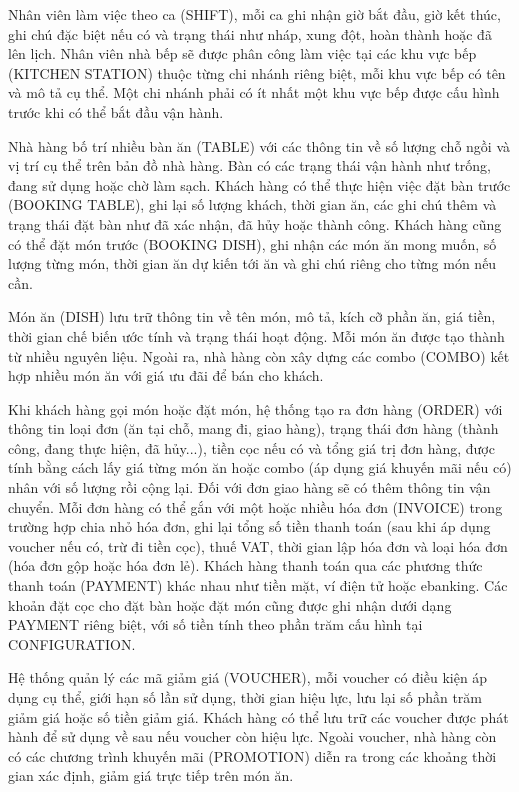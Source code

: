 Nhân viên làm việc theo ca (SHIFT), mỗi ca ghi nhận giờ bắt đầu, giờ kết thúc, ghi chú đặc biệt nếu có và trạng thái như nháp, xung đột, hoàn thành hoặc đã lên lịch. Nhân viên nhà bếp sẽ được phân công làm việc tại các khu vực bếp (KITCHEN STATION) thuộc từng chi nhánh riêng biệt, mỗi khu vực bếp có tên và mô tả cụ thể. Một chi nhánh phải có ít nhất một khu vực bếp được cấu hình trước khi có thể bắt đầu vận hành.

Nhà hàng bố trí nhiều bàn ăn (TABLE) với các thông tin về số lượng chỗ ngồi và vị trí cụ thể trên bản đồ nhà hàng. Bàn có các trạng thái vận hành như trống, đang sử dụng hoặc chờ làm sạch. Khách hàng có thể thực hiện việc đặt bàn trước (BOOKING TABLE), ghi lại số lượng khách, thời gian ăn, các ghi chú thêm và trạng thái đặt bàn như đã xác nhận, đã hủy hoặc thành công. Khách hàng cũng có thể đặt món trước (BOOKING DISH), ghi nhận các món ăn mong muốn, số lượng từng món, thời gian ăn dự kiến tới ăn và ghi chú riêng cho từng món nếu cần.

Món ăn (DISH) lưu trữ thông tin về tên món, mô tả, kích cỡ phần ăn, giá tiền, thời gian chế biến ước tính và trạng thái hoạt động. Mỗi món ăn được tạo thành từ nhiều nguyên liệu. Ngoài ra, nhà hàng còn xây dựng các combo (COMBO) kết hợp nhiều món ăn với giá ưu đãi để bán cho khách.

Khi khách hàng gọi món hoặc đặt món, hệ thống tạo ra đơn hàng (ORDER) với thông tin loại đơn (ăn tại chỗ, mang đi, giao hàng), trạng thái đơn hàng (thành công, đang thực hiện, đã hủy...), tiền cọc nếu có và tổng giá trị đơn hàng, được tính bằng cách lấy giá từng món ăn hoặc combo (áp dụng giá khuyến mãi nếu có) nhân với số lượng rồi cộng lại. Đối với đơn giao hàng sẽ có thêm thông tin vận chuyển. Mỗi đơn hàng có thể gắn với một hoặc nhiều hóa đơn (INVOICE) trong trường hợp chia nhỏ hóa đơn, ghi lại tổng số tiền thanh toán (sau khi áp dụng voucher nếu có, trừ đi tiền cọc), thuế VAT, thời gian lập hóa đơn và loại hóa đơn (hóa đơn gộp hoặc hóa đơn lẻ). Khách hàng thanh toán qua các phương thức thanh toán (PAYMENT) khác nhau như tiền mặt, ví điện tử hoặc ebanking. Các khoản đặt cọc cho đặt bàn hoặc đặt món cũng được ghi nhận dưới dạng PAYMENT riêng biệt, với số tiền tính theo phần trăm cấu hình tại CONFIGURATION.

Hệ thống quản lý các mã giảm giá (VOUCHER), mỗi voucher có điều kiện áp dụng cụ thể, giới hạn số lần sử dụng, thời gian hiệu lực, lưu lại số phần trăm giảm giá hoặc số tiền giảm giá. Khách hàng có thể lưu trữ các voucher được phát hành để sử dụng về sau nếu voucher còn hiệu lực. Ngoài voucher, nhà hàng còn có các chương trình khuyến mãi (PROMOTION) diễn ra trong các khoảng thời gian xác định, giảm giá trực tiếp trên món ăn.

